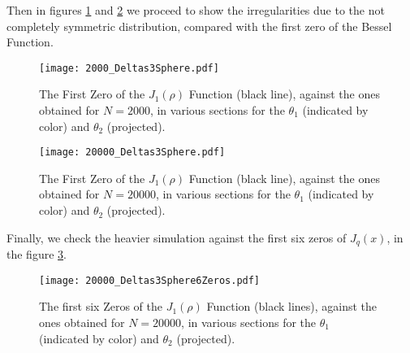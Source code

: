 \documentclass[a4paper,12pt]{article}
\begin{document}
Then in figures \ref{Zeros2000} and \ref{Zeros20000} 
we proceed to show the irregularities due to the
not completely symmetric distribution, compared with 
the first zero of the Bessel Function.

\begin{figure}
\begin{center}
  \texttt{[image: 2000\_Deltas3Sphere.pdf]}
\caption{The First Zero of the $J_1(\rho)$ Function (black line),
  against the ones obtained for $N=2000$, in various 
sections for the $\theta_1$ (indicated by color) and $\theta_2$ 
(projected).}
\label{Zeros2000}
\end{center}
\end{figure}
 

\begin{figure}
\begin{center}
  \texttt{[image: 20000\_Deltas3Sphere.pdf]}
\caption{The First Zero of the $J_1(\rho)$ Function (black line),
  against the ones obtained for $N=20000$, in various 
sections for the $\theta_1$ (indicated by color) and $\theta_2$ 
(projected).}
\label{Zeros20000}
\end{center}
\end{figure}
 
Finally, we check the heavier simulation against the first six
zeros of $J_q(x)$, in the figure \ref{SeisZeros}.


\begin{figure}
\begin{center}
  \texttt{[image: 20000\_Deltas3Sphere6Zeros.pdf]}
\caption{The first six Zeros of the $J_1(\rho)$ Function (black lines),
  against the ones obtained for $N=20000$, in various 
sections for the $\theta_1$ (indicated by color) and $\theta_2$ 
(projected).}
\label{SeisZeros}
\end{center}
\end{figure}



\end{document}
